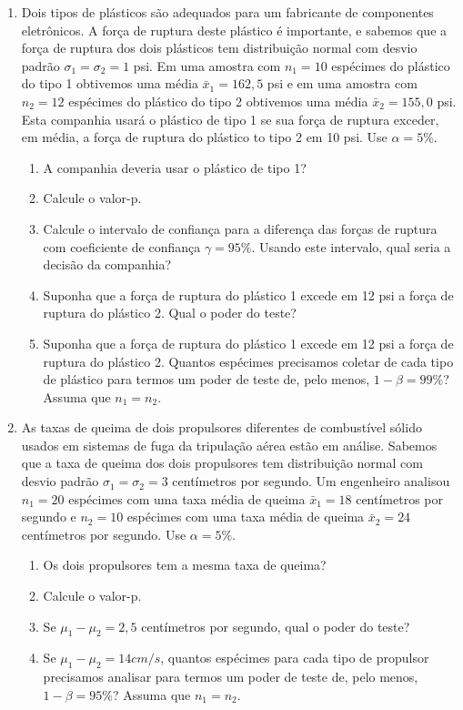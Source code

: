 \documentclass[8pt, a4paper]{article}
\begin{document}
\begin{enumerate}
	\item Dois tipos de plásticos são adequados para um fabricante de componentes eletrônicos. A força de ruptura deste plástico é importante, e sabemos que a força de ruptura dos dois plásticos tem distribuição normal com desvio padrão $\sigma_1=\sigma_2 = 1$ psi. Em uma amostra com $n_1=10$ espécimes do plástico do tipo 1 obtivemos uma média $\bar{x}_1=162,5$ psi e em uma amostra com $n_2=12$ espécimes do plástico do tipo 2 obtivemos uma média $\bar{x}_2=155,0$ psi. Esta companhia usará o plástico de tipo 1 se sua força de ruptura exceder, em média, a força de ruptura do plástico to tipo 2 em 10 psi. Use $\alpha=5\%$.
	\begin{enumerate}
		\item A companhia deveria usar o plástico de tipo 1?
		\item Calcule o valor-p.
		\item Calcule o intervalo de confiança para a diferença das forças de ruptura com coeficiente de confiança $\gamma=95\%$. Usando este intervalo, qual seria a decisão da companhia?
		\item Suponha que a força de ruptura do plástico 1 excede em 12 psi a força de ruptura do plástico 2. Qual o poder do teste?
		\item Suponha que a força de ruptura do plástico 1 excede em 12 psi a força de ruptura do plástico 2. Quantos espécimes precisamos coletar de cada tipo de plástico para termos um poder de teste de, pelo menos, $1-\beta = 99\%$? Assuma que $n_1 = n_2$.
	\end{enumerate}

	\item As taxas de queima de dois propulsores diferentes de combustível sólido usados em sistemas de fuga da tripulação aérea estão em análise. Sabemos que a taxa de queima dos dois propulsores tem distribuição normal com desvio padrão $\sigma_1=\sigma_2=3$ centímetros por segundo. Um engenheiro analisou $n_1=20$ espécimes com uma taxa média de queima $\bar{x}_1=18$ centímetros por segundo e $n_2=10$ espécimes com uma taxa média de queima $\bar{x}_2=24$ centímetros por segundo. Use $\alpha = 5\%$.
	\begin{enumerate}
		\item Os dois propulsores tem a mesma taxa de queima?
		\item Calcule o valor-p.
		\item Se $\mu_1 - \mu_2 = 2,5$ centímetros por segundo, qual o poder do teste?
		\item Se $\mu_1 - \mu_2 = 14 cm/s$, quantos espécimes para cada tipo de propulsor precisamos analisar para termos um poder de teste de, pelo menos, $1-\beta = 95\%$? Assuma que $n_1 = n_2$.
	\end{enumerate}


\end{enumerate}
\end{document}
